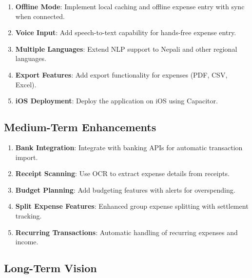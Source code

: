 \begin{enumerate}
    \item \textbf{Offline Mode}: Implement local caching and offline expense entry with sync when connected.
    
    \item \textbf{Voice Input}: Add speech-to-text capability for hands-free expense entry.
    
    \item \textbf{Multiple Languages}: Extend NLP support to Nepali and other regional languages.
    
    \item \textbf{Export Features}: Add export functionality for expenses (PDF, CSV, Excel).
    
    \item \textbf{iOS Deployment}: Deploy the application on iOS using Capacitor.
\end{enumerate}

\subsection{Medium-Term Enhancements}

\begin{enumerate}
    \item \textbf{Bank Integration}: Integrate with banking APIs for automatic transaction import.
    
    \item \textbf{Receipt Scanning}: Use OCR to extract expense details from receipts.
    
    \item \textbf{Budget Planning}: Add budgeting features with alerts for overspending.
    
    \item \textbf{Split Expense Features}: Enhanced group expense splitting with settlement tracking.
    
    \item \textbf{Recurring Transactions}: Automatic handling of recurring expenses and income.
\end{enumerate}

\subsection{Long-Term Vision}

